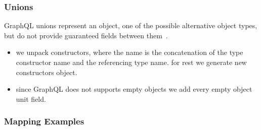 \begin{frame}\frametitle{Unions}

GraphQL unions represent an object, one of the possible alternative object types, but do not provide guaranteed fields between them~\cite{gql-spec}. 

\begin{itemize}
  \item we unpack constructors, where the name is the concatenation of the type constructor name and the referencing type name. for rest we generate new constructors object.
  \item since GraphQL does not supports empty objects we add every empty object unit field.
\end{itemize}


\end{frame}

\begin{frame}[allowframebreaks]\frametitle{Mapping Examples}
  




\end{frame}
